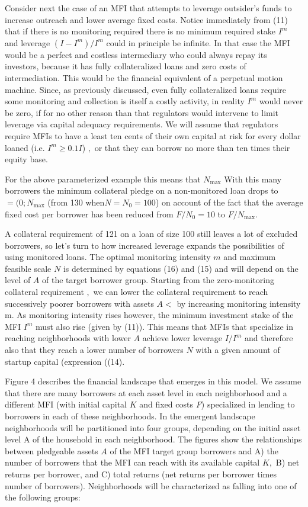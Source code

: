 \documentclass[
]{article}
\begin{document}
Consider next the case of an MFI that attempts to leverage outsider's
funds to increase outreach and lower average fixed costs. Notice
immediately from (11) that if there is no monitoring required there is
no minimum required stake \(I^{m}\) and leverage \((I - I^{m})/I^{m}\)
could in principle be infinite. In that case the MFI would be a perfect
and costless intermediary who could always repay its investors, because
it has fully collateralized loans and zero costs of intermediation. This
would be the financial equivalent of a perpetual motion machine. Since,
as previously discussed, even fully collateralized loans require some
monitoring and collection is itself a costly activity, in reality
\(I^{m}\) would never be zero, if for no other reason than that
regulators would intervene to limit leverage via capital adequacy
requirements. We will assume that regulators require MFIs to have a
least ten cents of their own capital at risk for every dollar loaned
(i.e. \(I^{m} \geq 0.1I\)) \(,\) or that they can borrow no more than
ten times their equity base.

For the above parameterized example this means that \(N_{\max}\) With
this many borrowers the minimum collateral pledge on a non-monitored
loan drops to \(= (0;N_{\max}\) (from 130 when\(N = N_{0} = 100\)) on
account of the fact that the average fixed cost per borrower has been
reduced from \(F/N_{0} = 10\) to \(F/N_{\max}\).

A collateral requirement of 121 on a loan of size 100 still leaves a lot
of excluded borrowers, so let's turn to how increased leverage expands
the possibilities of using monitored loans. The optimal monitoring
intensity \(m\) and maximum feasible scale \(N\) is determined by
equations (16) and (15) and will depend on the level of \(A\) of the
target borrower group. Starting from the zero-monitoring collateral
requirement \(,\) we can lower the collateral requirement to reach
successively poorer borrowers with assets \(A <\) by increasing
monitoring intensity \(\text{m.}\) As monitoring intensity rises
however, the minimum investment stake of the MFI \(I^{m}\) must also
rise (given by (11)). This means that MFIs that specialize in reaching
neighborhoods with lower \(A\) achieve lower leverage \(I/I^{m}\) and
therefore also that they reach a lower number of borrowers \(N\) with a
given amount of startup capital (expression ((14).

Figure 4 describes the financial landscape that emerges in this model.
We assume that there are many borrowers at each asset level in each
neighborhood and a different MFI (with initial capital \(K\) and fixed
costs \emph{F}) specialized in lending to borrowers in each of these
neighborhoods. In the emergent landscape neighborhoods will be
partitioned into four groups, depending on the initial asset level A of
the household in each neighborhood. The figures show the relationships
between pledgeable assets \(A\) of the MFI target group borrowers and A)
the number of borrowers that the MFI can reach with its available
capital \(K,\) B) net returns per borrower, and C) total returns (net
returns per borrower times number of borrowers). Neighborhoods will be
characterized as falling into one of the following groups:
\end{document}
